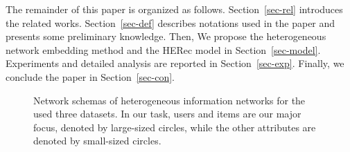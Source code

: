The remainder of this paper is organized as follows. Section~\ref{sec-rel} introduces the related works. Section~\ref{sec-def} describes notations used in the paper and presents some preliminary knowledge. Then, We propose the heterogeneous network embedding method and the HERec model in Section~\ref{sec-model}. Experiments and detailed analysis are reported in Section~\ref{sec-exp}. Finally, we conclude the paper in Section~\ref{sec-con}.

\begin{figure*}[t]
\centering
{}
\caption{\label{fig_schema}Network schemas of heterogeneous information networks for the used three datasets.
In our task, users and items are our major focus, denoted by large-sized circles, while the other attributes are denoted by small-sized circles. }

\end{figure*}

